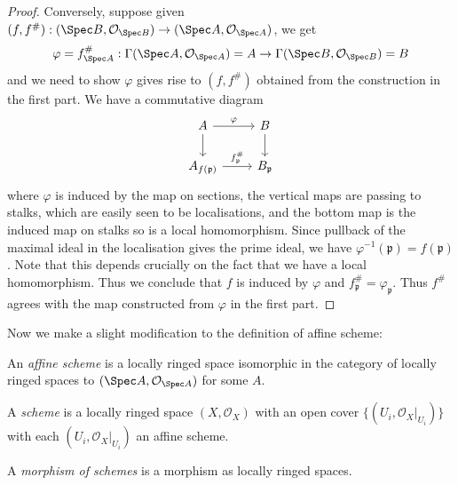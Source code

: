 \documentclass[a4paper]{article}
\newcommand{\sh}[1]{\mathcal{#1}} %
\begin{document}
\begin{proof}
  Conversely, suppose given \((f, f^\#): (\Spec B, \sh O_{\Spec B}) \to (\Spec A, \sh O_{\Spec A})\), we get
  \[
    \varphi = f_{\Spec A}^\#: \Gamma(\Spec A, \sh O_{\Spec A}) = A \to \Gamma(\Spec B, \sh O_{\Spec B}) = B
  \]
  and we need to show \(\varphi\) gives rise to \((f, f^\#)\) obtained from the construction in the first part. We have a commutative diagram
  \[
    \begin{tikzcd}
      A \ar[r, "\varphi"] \ar[d] & B \ar[d] \\
      A_{f(\mathfrak p)} \ar[r, "f_{\mathfrak p}^\#"] & B_{\mathfrak p}
    \end{tikzcd}
  \]
  where \(\varphi\) is induced by the map on sections, the vertical maps are passing to stalks, which are easily seen to be localisations, and the bottom map is the induced map on stalks so is a local homomorphism. Since pullback of the maximal ideal in the localisation gives the prime ideal, we have \(\varphi^{-1}(\mathfrak p) = f(\mathfrak p)\). Note that this depends crucially on the fact that we have a local homomorphism. Thus we conclude that \(f\) is induced by \(\varphi\) and \(f_{\mathfrak p}^\# = \varphi_{\mathfrak p}\). Thus \(f^\#\) agrees with the map constructed from \(\varphi\) in the first part.
\end{proof}

Now we make a slight modification to the definition of affine scheme:
\begin{definition}
  An \emph{affine scheme} is a locally ringed space isomorphic in the category of locally ringed spaces to \((\Spec A, \sh O_{\Spec A})\) for some \(A\).
\end{definition}

\begin{definition}[scheme]
  A \emph{scheme} is a locally ringed space \((X, \sh O_X)\) with an open cover \(\{(U_i, \sh O_X|_{U_i})\}\) with each \((U_i, \sh O_X|_{U_i})\) an affine scheme.

  A \emph{morphism of schemes} is a morphism as locally ringed spaces.
\end{definition}
\end{document}
